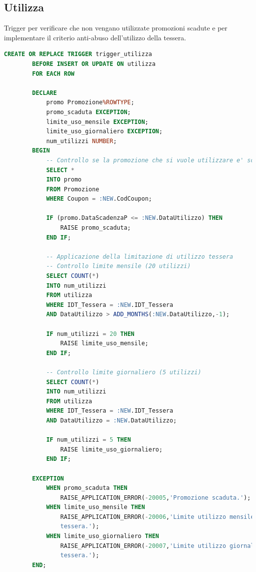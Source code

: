 \documentclass[12pt]{report}
\begin{document}
\subsection*{Utilizza}
Trigger per verificare che non vengano utilizzate promozioni scadute e per implementare il criterio anti-abuso dell'utilizzo della tessera. 
\begin{lstlisting}[language=SQL,caption={TR\_UTILIZZA}]
        CREATE OR REPLACE TRIGGER trigger_utilizza
		BEFORE INSERT OR UPDATE ON utilizza
		FOR EACH ROW

		DECLARE
			promo Promozione%ROWTYPE;
			promo_scaduta EXCEPTION;
			limite_uso_mensile EXCEPTION;
			limite_uso_giornaliero EXCEPTION;
			num_utilizzi NUMBER;
		BEGIN
			-- Controllo se la promozione che si vuole utilizzare e' scaduta
			SELECT * 
			INTO promo
			FROM Promozione  
			WHERE Coupon = :NEW.CodCoupon;

			IF (promo.DataScadenzaP <= :NEW.DataUtilizzo) THEN
				RAISE promo_scaduta;
			END IF;

			-- Applicazione della limitazione di utilizzo tessera
			-- Controllo limite mensile (20 utilizzi)
			SELECT COUNT(*)
			INTO num_utilizzi
			FROM utilizza
			WHERE IDT_Tessera = :NEW.IDT_Tessera
			AND DataUtilizzo > ADD_MONTHS(:NEW.DataUtilizzo,-1);

			IF num_utilizzi = 20 THEN
				RAISE limite_uso_mensile;
			END IF;
			
			-- Controllo limite giornaliero (5 utilizzi)
			SELECT COUNT(*)
			INTO num_utilizzi
			FROM utilizza
			WHERE IDT_Tessera = :NEW.IDT_Tessera
			AND DataUtilizzo = :NEW.DataUtilizzo;

			IF num_utilizzi = 5 THEN
				RAISE limite_uso_giornaliero;
			END IF;
		
		EXCEPTION
			WHEN promo_scaduta THEN
				RAISE_APPLICATION_ERROR(-20005,'Promozione scaduta.');
			WHEN limite_uso_mensile THEN
				RAISE_APPLICATION_ERROR(-20006,'Limite utilizzo mensile 
				tessera.');
			WHEN limite_uso_giornaliero THEN
				RAISE_APPLICATION_ERROR(-20007,'Limite utilizzo giornaliero 
				tessera.');
        END;
\end{lstlisting}
\end{document}
